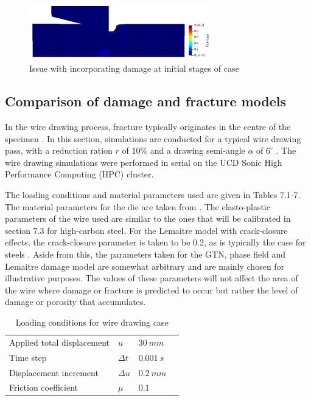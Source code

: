 \documentclass[sn-mathphys,Numbered,draft]{sn-jnl}%
\begin{document}
\begin{figure}[htb]
\begin{center}
	\includegraphics[width=0.7\textwidth]{./Figures/SimulationAndAnalysis/damageIssue.png}
\caption{Issue with incorporating damage at initial stages of case}
\label{fig:notchedRoundBAr}
\end{center}
\end{figure}

\FloatBarrier

\subsection{Comparison of damage and fracture models}

In the wire drawing process, fracture typically originates in the centre of the specimen \cite{gonzalez_assessment_2018,norasethasopon_prediction_2008,hoffmanner_selection_1971,choi_study_2010}. In this section, simulations are conducted for a typical wire drawing pass, with a reduction ration $r$ of 10\% and a drawing semi-angle $\alpha$ of $6^{\circ}$ \cite{roh_process_2021}. The wire drawing simulations were performed in serial on the UCD Sonic High Performance Computing (HPC) cluster.

The loading conditions and material parameters used are given in Tables 7.1-7. The material parameters for the die are taken from \citet{clancy_improving_2019}. The elasto-plastic parameters of the wire used are similar to the ones that will be calibrated in section 7.3 for high-carbon steel. For the Lemaitre model with crack-closure effects, the crack-closure parameter is taken to be 0.2, as is typically the case for steels \cite{desmorat_modeling_2008,lemaitre_course_1996,bouchard_enhanced_2011}. Aside from this, the parameters taken for the GTN, phase field and Lemaitre damage model are somewhat arbitrary and are mainly chosen for illustrative purposes. The values of these parameters will not affect the area of the wire where damage or fracture is predicted to occur but rather the level of damage or porosity that accumulates.

\begin{table}[htb]
	\centering
		\begin{tabular}{llll} \hline
		    Applied total displacement & $u$ & $30\ mm$ \\
		    Time step & $\Delta t$ & $0.001\ s$ \\
			Displacement increment  & $\Delta u$ & $0.2\ mm$   \\
			Friction coefficient & $\mu$ & $0.1$ \\
			\hline
		\end{tabular}
	\caption{Loading conditions for wire drawing case}
	\label{tab:material_properties}
\end{table}
\end{document}
